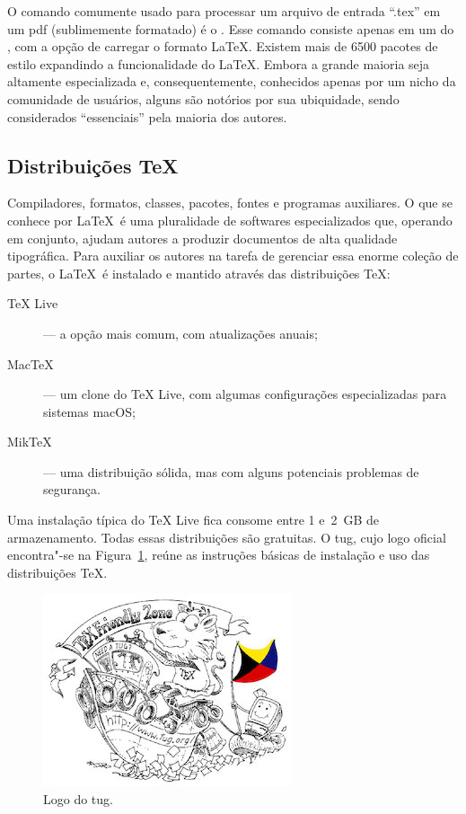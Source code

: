 O comando comumente usado para processar um arquivo de entrada \enquote{.tex} em um \ac{pdf} (sublimemente formatado) é o \pdflatex. Esse comando consiste apenas em um  do \pdftex, com a opção de carregar o formato \LaTeX. Existem mais de 6500 pacotes de estilo expandindo a funcionalidade do \LaTeX. Embora a grande maioria seja altamente especializada e, consequentemente, conhecidos apenas por um nicho da comunidade de usuários, alguns são notórios por sua ubiquidade, sendo considerados \enquote{essenciais} pela maioria dos autores.

\subsection{Distribuições \TeX}

Compiladores, formatos, classes, pacotes, fontes e programas auxiliares. O que se conhece por \LaTeX\ é uma pluralidade de softwares especializados que, operando em conjunto, ajudam autores a produzir documentos de alta qualidade tipográfica. Para auxiliar os autores na tarefa de gerenciar essa enorme coleção de partes, o \LaTeX\ é instalado e mantido através das distribuições \TeX:
\begin{description}
	\item[TeX Live] --- a opção mais comum, com atualizações anuais;
	\item[MacTeX] --- um clone do TeX Live, com algumas configurações especializadas para sistemas macOS;
	\item[MikTeX] --- uma distribuição sólida, mas com alguns potenciais problemas de segurança.
\end{description}
Uma instalação típica do TeX Live fica consome entre 1 e~2~GB de armazenamento. Todas essas distribuições são gratuitas. O \ac{tug}, cujo logo oficial encontra"-se na Figura~\ref{fig:tug}, reúne as instruções básicas de instalação e uso das distribuições \TeX.

\begin{figure}
	\caption{Logo do \ac{tug}.}
	\label{fig:tug}
	\includegraphics{./figuras/tug}
\end{figure}

